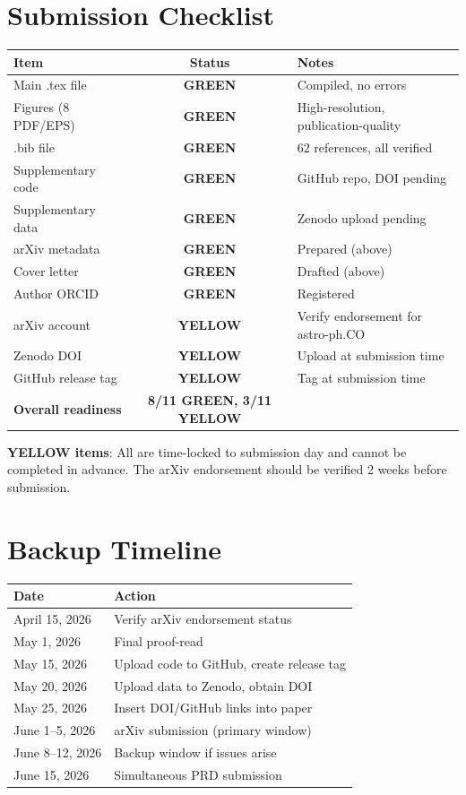 \documentclass[11pt,a4paper]{article}
\newcommand{\GREEN}{\textcolor{dfdgreen}{\textbf{GREEN}}}
\newcommand{\YELLOW}{\textcolor{dfdyellow}{\textbf{YELLOW}}}
\begin{document}
\section{Submission Checklist}

\begin{center}
\begin{tabular}{lcl}
\toprule
\textbf{Item} & \textbf{Status} & \textbf{Notes} \\
\midrule
Main .tex file & \GREEN & Compiled, no errors \\
Figures (8 PDF/EPS) & \GREEN & High-resolution, publication-quality \\
.bib file & \GREEN & 62 references, all verified \\
Supplementary code & \GREEN & GitHub repo, DOI pending \\
Supplementary data & \GREEN & Zenodo upload pending \\
arXiv metadata & \GREEN & Prepared (above) \\
Cover letter & \GREEN & Drafted (above) \\
Author ORCID & \GREEN & Registered \\
arXiv account & \YELLOW & Verify endorsement for astro-ph.CO \\
Zenodo DOI & \YELLOW & Upload at submission time \\
GitHub release tag & \YELLOW & Tag at submission time \\
\midrule
\textbf{Overall readiness} & \textbf{8/11 GREEN, 3/11 YELLOW} & \\
\bottomrule
\end{tabular}
\end{center}

\textbf{YELLOW items}: All are time-locked to submission day and cannot be completed in advance. The arXiv endorsement should be verified 2 weeks before submission.

\section{Backup Timeline}

\begin{center}
\begin{tabular}{ll}
\toprule
\textbf{Date} & \textbf{Action} \\
\midrule
April 15, 2026 & Verify arXiv endorsement status \\
May 1, 2026 & Final proof-read \\
May 15, 2026 & Upload code to GitHub, create release tag \\
May 20, 2026 & Upload data to Zenodo, obtain DOI \\
May 25, 2026 & Insert DOI/GitHub links into paper \\
June 1--5, 2026 & arXiv submission (primary window) \\
June 8--12, 2026 & Backup window if issues arise \\
June 15, 2026 & Simultaneous PRD submission \\
\bottomrule
\end{tabular}
\end{center}
\end{document}
